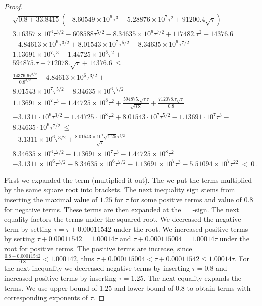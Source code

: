 \documentclass{article}
\renewcommand{\leq}{\leqslant}
\begin{document}
\begin{proof}
\begin{align}
&\sqrt{0.8 +33.8415} \left(-8.60549\times 10^6 \tau^3-5.28876\times 10^7 \tau^2+91200.4 \sqrt{\tau}\right)-\\ \nonumber 
&3.16357\times 10^6 \tau^{3/2}-608588 \tau^{5/2}-8.34635\times 10^6 \tau^{7/2}+117482. \tau^2+14376.6\ = \\ \nonumber 
&-4.84613\times 10^6 \tau^{3/2}+8.01543\times 10^7 \tau^{5/2}-8.34635\times 10^6 \tau^{7/2}-\\ \nonumber 
&1.13691\times 10^7 \tau^3-1.44725\times 10^8 \tau^2+\\ \nonumber 
&594875. \tau+712078. \sqrt{\tau}+14376.6\ \leq \\ \nonumber
&\frac{14376.6 \tau^{3/2}}{0.8^{3/2}}-4.84613\times 10^6 \tau^{3/2}+\\ \nonumber 
&8.01543\times 10^7 \tau^{5/2}-8.34635\times 10^6 \tau^{7/2}-\\ \nonumber
&1.13691\times 10^7 \tau^3-1.44725\times 10^8 \tau^2+\frac{594875. \sqrt{\tau} \tau}{\sqrt{0.8}}+\frac{712078. \tau \sqrt{\tau}}{0.8}\ = \\ \nonumber
&-3.1311 \cdot 10^6 \tau^{3/2}-1.44725 \cdot 10^8 \tau^2+8.01543 \cdot 10^7 \tau^{5/2}-1.13691 \cdot 10^7 \tau^3-\\ \nonumber 
&8.34635 \cdot 10^6 \tau^{7/2}\ \leq \\ \nonumber 
& -3.1311\times 10^6 \tau^{3/2}+\frac{8.01543\times 10^7 \sqrt{1.25} \tau^{5/2}}{\sqrt{\tau}}-\\ \nonumber
&8.34635\times 10^6 \tau^{7/2}-1.13691\times 10^7 \tau^3-1.44725\times 10^8 \tau^2\ = \\ \nonumber 
&-3.1311\times 10^6 \tau^{3/2}-8.34635\times 10^6 \tau^{7/2}-1.13691\times 10^7 \tau^3-5.51094\times 10^7 \tau^22\ < \ 0 \ . 
\end{align}

First we expanded the term (multiplied it out).
The we put the terms multiplied by the same square root into brackets.
The next inequality sign stems from inserting the maximal value of $1.25$ for $\tau$ for
some positive terms and value of $0.8$ for negative terms. 
These terms are then expanded at the $=$-sign.
The next equality factors the terms under the squared root.
We decreased the negative term by setting
$\tau=\tau+0.00011542$ under the root.
We increased positive terms by setting  
$\tau+0.00011542=1.00014\tau$ and
$\tau+0.000115004 = 1.00014\tau$
under the root for positive terms.
The positive terms are increase, since
$\frac{0.8 + 0.00011542}{0.8}<1.000142$, thus
$\tau+0.000115004<\tau+0.00011542 \leq
1.00014\tau$.
For the next inequality we decreased negative terms by inserting
$\tau=0.8$ and increased positive terms by inserting
$\tau=1.25$. The next equality expands the terms.
We use upper bound of $1.25$ and lower bound of $0.8$ to obtain terms with
corresponding exponents of $\tau$.


\end{proof}
\end{document}
